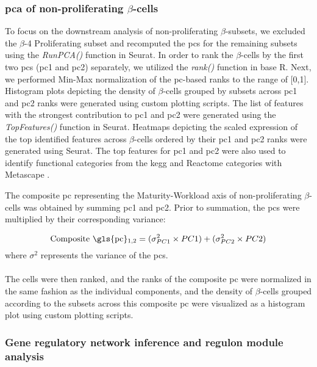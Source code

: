 \subsubsection{\large \gls{pca} of non-proliferating $\beta$-cells}
\label{subsubsec:met_chp3_pca}
\par To focus on the downstream analysis of non-proliferating $\beta$-subsets, we excluded the $\beta$-4 Proliferating subset and recomputed the \glspl{pc} for the remaining subsets using the \textit{RunPCA()} function in Seurat. In order to rank the $\beta$-cells by the first two \glspl{pc} (\gls{pc}1 and \gls{pc}2) separately, we utilized the \textit{rank()} function in base R. Next, we performed Min-Max normalization of the \gls{pc}-based ranks to the range of [0,1]. Histogram plots depicting the density of $\beta$-cells grouped by subsets across \gls{pc}1 and \gls{pc}2 ranks were generated using custom plotting scripts. The list of features with the strongest contribution to  \gls{pc}1 and \gls{pc}2 were generated using the \textit{TopFeatures()} function in Seurat. Heatmaps depicting the scaled expression of the top identified features across $\beta$-cells ordered by their \gls{pc}1 and \gls{pc}2 ranks were generated using Seurat. The top features for \gls{pc}1 and \gls{pc}2 were also used to identify functional categories from the \gls{kegg} and Reactome categories with Metascape \textbf{\cite{zhou_metascape_2019}}.\\

\par The composite \gls{pc} representing the Maturity-Workload axis of non-proliferating $\beta$-cells was obtained by summing \gls{pc}1 and \gls{pc}2. Prior to summation, the \glspl{pc} were multiplied by their corresponding variance:

\begin{equation}
    \text{Composite \gls{pc}\textsubscript{1,2}} = (\sigma^2_{PC1} \times PC1) + (\sigma^2_{PC2} \times PC2)
\end{equation}
where $\sigma^2$ represents the variance of the \glspl{pc}.\\\\

The cells were then ranked, and the ranks of the composite \gls{pc} were normalized in the same fashion as the individual components, and the density of $\beta$-cells grouped according to the subsets across this composite \gls{pc} were visualized as a histogram plot using custom plotting scripts. 

\subsubsection{\large Gene regulatory network inference and regulon module analysis}
\label{subsubsec:met_chp3_scenic}

